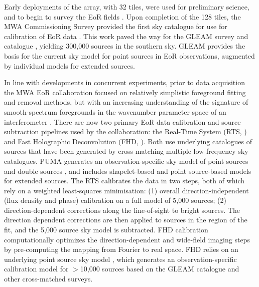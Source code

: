 Early deployments of the array, with 32 tiles, were used for preliminary science, and to begin to survey the EoR fields \cite{2012ApJ...755...47W}. Upon completion of the 128 tiles, the MWA Commissioning Survey provided the first sky catalogue for use for calibration of EoR data \cite{2014PASA...31...45H}. This work paved the way for the GLEAM survey \cite{wayth15} and catalogue \cite{hurleywalker16}, yielding 300,000 sources in the southern sky. GLEAM provides the basis for the current sky model for point sources in EoR observations, augmented by individual models for extended sources.

In line with developments in concurrent experiments, prior to data acquisition the MWA EoR collaboration focused on relatively simplistic foreground fitting and removal methods, but with an increasing understanding of the signature of smooth-spectrum foregrounds in the wavenumber parameter space of an interferometer \cite{2009ApJ...695..183B,datta10,trott12}. 
There are now two primary EoR data calibration and source subtraction pipelines used by the collaboration: the Real-Time System (RTS, \cite{mitchell08}) and Fast Holographic Deconvolution (FHD, \cite{2012ApJ...759...17S}). Both use underlying catalogues of sources that have been generated by cross-matching multiple low-frequency sky catalogues. PUMA \cite{line17} generates an observation-specific sky model of point sources and double sources \cite{procopio15}, and includes shapelet-based and point source-based models for extended sources. The RTS calibrates the data in two steps, both of which rely on a weighted least-squares minimisation: (1) overall direction-independent (flux density and phase) calibration on a full model of 5,000 sources; (2) direction-dependent corrections along the line-of-sight to bright sources. The direction dependent corrections are then applied to sources in the region of the fit, and the 5,000 source sky model is subtracted.
FHD calibration \cite{2012ApJ...759...17S} computationally optimizes the direction-dependent and wide-field imaging steps by pre-computing the mapping from Fourier to real space. FHD relies on an underlying point source sky model \cite{2016MNRAS.461.4151C}, which generates an observation-specific calibration model for $>$10,000 sources based on the GLEAM catalogue and other cross-matched surveys.

